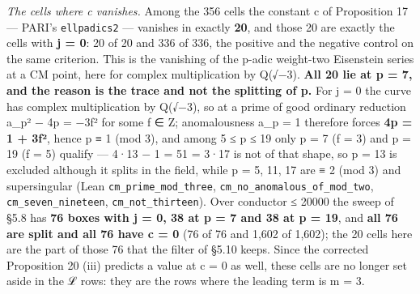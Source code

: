 \documentclass[11pt,a4paper]{article}
\theoremstyle{named}
\begin{document}
\textit{The cells where c vanishes.} Among the 356 cells the constant c of Proposition 17 — PARI's \texttt{ellpadics2} — vanishes in exactly \textbf{20}, and those 20 are exactly the cells with \textbf{j = 0}: 20 of 20 and 336 of 336, the positive and the negative control on the same criterion. This is the vanishing of the p-adic weight-two Eisenstein series at a CM point, here for complex multiplication by Q(√−3). \textbf{All 20 lie at p = 7, and the reason is the trace and not the splitting of p.} For j = 0 the curve has complex multiplication by Q(√−3), so at a prime of good ordinary reduction a\_p² − 4p = −3f² for some f ∈ Z; anomalousness a\_p = 1 therefore forces \textbf{4p = 1 + 3f²}, hence p ≡ 1 (mod 3), and among 5 ≤ p ≤ 19 only p = 7 (f = 3) and p = 19 (f = 5) qualify — 4·13 − 1 = 51 = 3·17 is not of that shape, so p = 13 is excluded although it splits in the field, while p = 5, 11, 17 are ≡ 2 (mod 3) and supersingular (Lean \texttt{cm\_\allowbreak{}prime\_\allowbreak{}mod\_\allowbreak{}three}, \texttt{cm\_\allowbreak{}no\_\allowbreak{}anomalous\_\allowbreak{}of\_\allowbreak{}mod\_\allowbreak{}two}, \texttt{cm\_\allowbreak{}seven\_\allowbreak{}nineteen}, \texttt{cm\_\allowbreak{}not\_\allowbreak{}thirteen}). Over conductor ≤ 20000 the sweep of §5.8 has \textbf{76 boxes with j = 0, 38 at p = 7 and 38 at p = 19}, and \textbf{all 76 are split and all 76 have c = 0} (76 of 76 and 1,602 of 1,602); the 20 cells here are the part of those 76 that the filter of §5.10 keeps. Since the corrected Proposition 20 (iii) predicts a value at c = 0 as well, these cells are no longer set aside in the ℒ rows: they are the rows where the leading term is m = 3.
\end{document}
